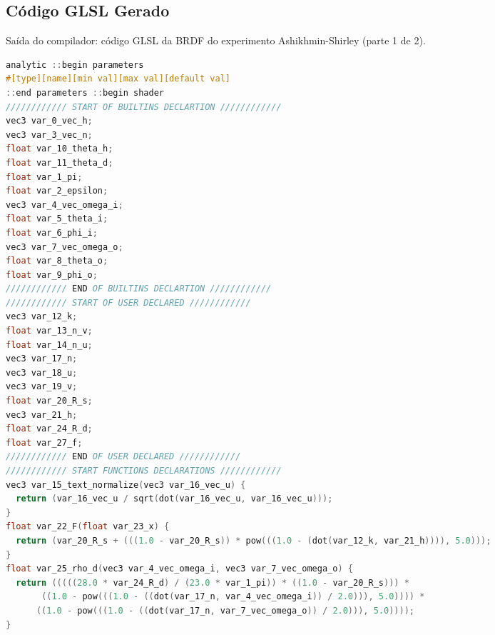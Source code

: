 \subsection{Código GLSL Gerado}
\begin{codigo}[H]
    \caption{\small Saída do compilador: código GLSL da BRDF do experimento Ashikhmin-Shirley (parte 1 de 2).}
    \label{cod-ashikhmin-shirley-close-to-original-glsl-pt-1}
\begin{lstlisting}[language=C, inputencoding=utf8]
analytic ::begin parameters
#[type][name][min val][max val][default val]
::end parameters ::begin shader
//////////// START OF BUILTINS DECLARTION ////////////
vec3 var_0_vec_h;
vec3 var_3_vec_n;
float var_10_theta_h;
float var_11_theta_d;
float var_1_pi;
float var_2_epsilon;
vec3 var_4_vec_omega_i;
float var_5_theta_i;
float var_6_phi_i;
vec3 var_7_vec_omega_o;
float var_8_theta_o;
float var_9_phi_o;
//////////// END OF BUILTINS DECLARTION ////////////
//////////// START OF USER DECLARED ////////////
vec3 var_12_k;
float var_13_n_v;
float var_14_n_u;
vec3 var_17_n;
vec3 var_18_u;
vec3 var_19_v;
float var_20_R_s;
vec3 var_21_h;
float var_24_R_d;
float var_27_f;
//////////// END OF USER DECLARED ////////////
//////////// START FUNCTIONS DECLARATIONS ////////////
vec3 var_15_text_normalize(vec3 var_16_vec_u) {
  return (var_16_vec_u / sqrt(dot(var_16_vec_u, var_16_vec_u)));
}
float var_22_F(float var_23_x) {
  return (var_20_R_s + (((1.0 - var_20_R_s)) * pow(((1.0 - (dot(var_12_k, var_21_h)))), 5.0)));
}
float var_25_rho_d(vec3 var_4_vec_omega_i, vec3 var_7_vec_omega_o) {
  return (((((28.0 * var_24_R_d) / (23.0 * var_1_pi)) * ((1.0 - var_20_R_s))) *
       ((1.0 - pow(((1.0 - ((dot(var_17_n, var_4_vec_omega_i)) / 2.0))), 5.0)))) *
      ((1.0 - pow(((1.0 - ((dot(var_17_n, var_7_vec_omega_o)) / 2.0))), 5.0))));
}
\end{lstlisting}
\end{codigo}

